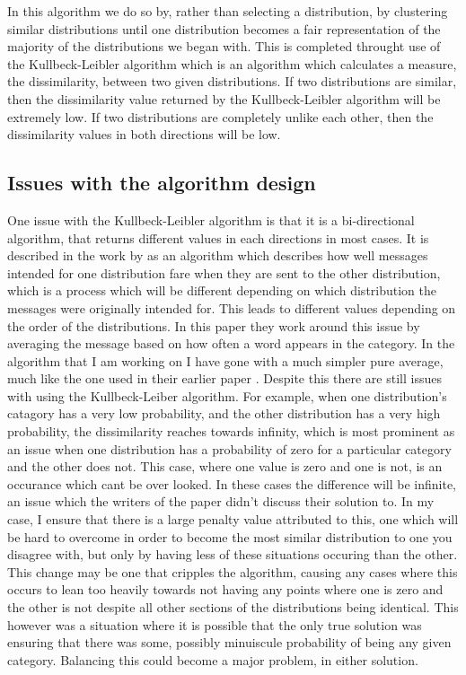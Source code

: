 \documentclass[letterpaper]{article}
\begin{document}
In this algorithm we do so by, rather than selecting a distribution, by clustering similar distributions until one distribution becomes a fair representation of the majority of the distributions
we began with. This is completed throught use of the Kullbeck-Leibler algorithm \cite{kullbeckLeibler} which is an algorithm which calculates a measure, the dissimilarity, between two given distributions. If two distributions are similar, then the dissimilarity value returned by the Kullbeck-Leibler algorithm will be extremely low. If two distributions are completely unlike each other, then the dissimilarity values in both directions will be low. 

\subsection{Issues with the algorithm design}
One issue with the Kullbeck-Leibler algorithm is that it is a bi-directional algorithm, that returns different values in each directions in most cases. 
It is described in the work by \cite{distCluster} as an algorithm which describes how well messages intended for one distribution fare when they are sent to the other distribution, which is a process which will be different depending on which distribution the messages were originally intended for. 
This leads to different values depending on the order of the distributions. 
In this paper they work around this issue by averaging the message based on how often a word appears in the category. 
In the algorithm that I am working on I have gone with a much simpler pure average, much like the one used in their earlier paper \cite{distClusterEarlier}.
Despite this there are still issues with using the Kullbeck-Leiber algorithm. For example, when one distribution's catagory has a very low probability, and the other distribution has a very high probability, the dissimilarity reaches towards infinity, which is most prominent as an issue when one distribution has a probability of zero for a particular category and the other does not. This case, where one value is zero and one is not, is an occurance which cant be over looked. In these cases the difference will be infinite, an issue which the writers of the paper didn't discuss their solution to. In my case, I ensure that there is a large penalty value attributed to this, one which will be hard to overcome in order to become the most similar distribution to one you disagree with, but only by having less of these situations occuring than the other. This change may be one that cripples the algorithm, causing any cases where this occurs to lean too heavily towards not having any points where one is zero and the other is not despite all other sections of the distributions being identical. This however was a situation where it is possible that the only true solution was ensuring that there was some, possibly minuiscule probability of being any given category.
Balancing this could become a major problem, in either solution. 
\end{document}
